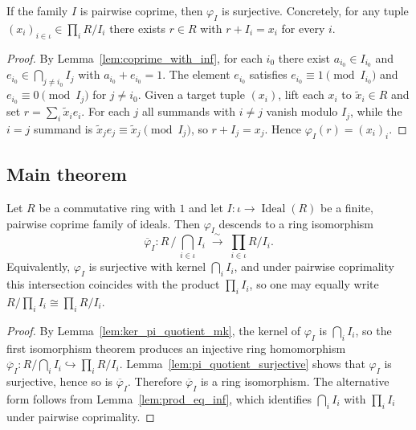 \begin{lemma}
    \label{lem:pi_quotient_surjective}
    If the family $I$ is pairwise coprime, then $\varphi_I$ is
    surjective. Concretely, for any tuple $(x_i)_{i \in \iota} \in
    \prod_i R/I_i$ there exists $r \in R$ with $r + I_i = x_i$ for
    every $i$.
\end{lemma}
\begin{proof}
    By Lemma~\ref{lem:coprime_with_inf}, for each $i_0$ there exist
    $a_{i_0} \in I_{i_0}$ and $e_{i_0} \in \bigcap_{j \neq i_0} I_j$
    with $a_{i_0} + e_{i_0} = 1$. The element $e_{i_0}$ satisfies
    $e_{i_0} \equiv 1 \pmod{I_{i_0}}$ and $e_{i_0} \equiv 0 \pmod{I_j}$
    for $j \neq i_0$. Given a target tuple $(x_i)$, lift each $x_i$ to
    $\tilde{x}_i \in R$ and set $r = \sum_i \tilde{x}_i e_i$. For each
    $j$ all summands with $i \neq j$ vanish modulo $I_j$, while the
    $i = j$ summand is $\tilde{x}_j e_j \equiv \tilde{x}_j \pmod{I_j}$,
    so $r + I_j = x_j$. Hence $\varphi_I(r) = (x_i)_i$.
\end{proof}

\subsection{Main theorem}

\begin{theorem}
    \label{thm:chinese_remainder}
    Let $R$ be a commutative ring with $1$ and let
    $I : \iota \to \operatorname{Ideal}(R)$ be a finite, pairwise
    coprime family of ideals. Then $\varphi_I$ descends to a ring
    isomorphism
    \[
        \overline{\varphi}_I \colon
        R \,\big/\, \bigcap_{i \in \iota} I_i
        \;\xrightarrow{\;\sim\;}\;
        \prod_{i \in \iota} R / I_i.
    \]
    Equivalently, $\varphi_I$ is surjective with kernel
    $\bigcap_i I_i$, and under pairwise coprimality this intersection
    coincides with the product $\prod_i I_i$, so one may equally write
    $R / \prod_i I_i \cong \prod_i R / I_i$.
\end{theorem}
\begin{proof}
    By Lemma~\ref{lem:ker_pi_quotient_mk}, the kernel of $\varphi_I$
    is $\bigcap_i I_i$, so the first isomorphism theorem produces an
    injective ring homomorphism
    $\overline{\varphi}_I : R / \bigcap_i I_i \hookrightarrow \prod_i
    R / I_i$. Lemma~\ref{lem:pi_quotient_surjective} shows that
    $\varphi_I$ is surjective, hence so is $\overline{\varphi}_I$.
    Therefore $\overline{\varphi}_I$ is a ring isomorphism. The
    alternative form follows from
    Lemma~\ref{lem:prod_eq_inf}, which identifies
    $\bigcap_i I_i$ with $\prod_i I_i$ under pairwise coprimality.
\end{proof}
